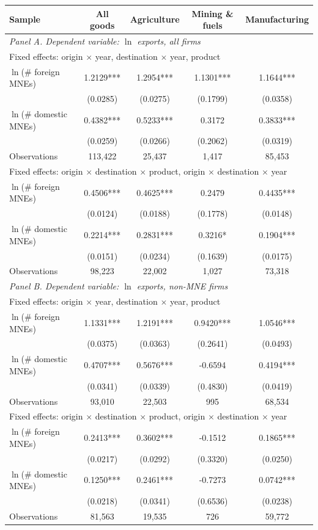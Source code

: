 \begin{tabular}{lcccc} \hline
Sample & All goods & Agriculture & Mining \& fuels & Manufacturing \\ \hline
\multicolumn{5}{l}{\textit{Panel A. Dependent variable: $\ln$ exports, all firms}} \\
\multicolumn{5}{l}{\footnotesize Fixed effects: origin $\times$ year, destination $\times$ year, product} \\
\quad $\ln$(\# foreign MNEs) & 1.2129*** & 1.2954*** & 1.1301*** & 1.1644*** \\
 & (0.0285) & (0.0275) & (0.1799) & (0.0358) \\
\quad $\ln$(\# domestic MNEs) & 0.4382*** & 0.5233*** & 0.3172 & 0.3833*** \\
 & (0.0259) & (0.0266) & (0.2062) & (0.0319) \\
\quad Observations & 113,422 & 25,437 & 1,417 & 85,453 \\
\multicolumn{5}{l}{\footnotesize Fixed effects: origin $\times$ destination $\times$ product, origin $\times$ destination $\times$ year} \\
\quad $\ln$(\# foreign MNEs) & 0.4506*** & 0.4625*** & 0.2479 & 0.4435*** \\
 & (0.0124) & (0.0188) & (0.1778) & (0.0148) \\
\quad $\ln$(\# domestic MNEs) & 0.2214*** & 0.2831*** & 0.3216* & 0.1904*** \\
 & (0.0151) & (0.0234) & (0.1639) & (0.0175) \\
\quad Observations & 98,223 & 22,002 & 1,027 & 73,318 \\
\midrule
\multicolumn{5}{l}{\textit{Panel B. Dependent variable: $\ln$ exports, non-MNE firms}} \\
\multicolumn{5}{l}{\footnotesize Fixed effects: origin $\times$ year, destination $\times$ year, product} \\
\quad $\ln$(\# foreign MNEs) & 1.1331*** & 1.2191*** & 0.9420*** & 1.0546*** \\
 & (0.0375) & (0.0363) & (0.2641) & (0.0493) \\
\quad $\ln$(\# domestic MNEs) & 0.4707*** & 0.5676*** & -0.6594 & 0.4194*** \\
 & (0.0341) & (0.0339) & (0.4830) & (0.0419) \\
\quad Observations & 93,010 & 22,503 & 995 & 68,534 \\
\multicolumn{5}{l}{\footnotesize Fixed effects: origin $\times$ destination $\times$ product, origin $\times$ destination $\times$ year} \\
\quad $\ln$(\# foreign MNEs) & 0.2413*** & 0.3602*** & -0.1512 & 0.1865*** \\
 & (0.0217) & (0.0292) & (0.3320) & (0.0250) \\
\quad $\ln$(\# domestic MNEs) & 0.1250*** & 0.2461*** & -0.7273 & 0.0742*** \\
 & (0.0218) & (0.0341) & (0.6536) & (0.0238) \\
\quad Observations & 81,563 & 19,535 & 726 & 59,772 \\
\hline
\end{tabular}
